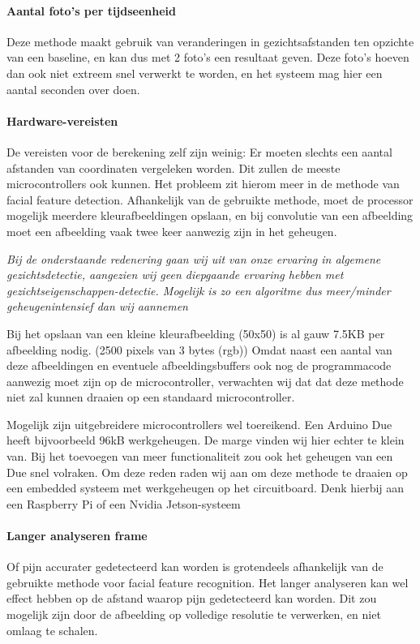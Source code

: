 \documentclass[11pt]{article}
\begin{document}
    \paragraph{Aantal foto's per tijdseenheid}
    Deze methode maakt gebruik van veranderingen in gezichtsafstanden ten opzichte van een baseline, en kan dus met 2 foto's een resultaat geven.
    Deze foto's hoeven dan ook niet extreem snel verwerkt te worden, en het systeem mag hier een aantal seconden over doen.

    \paragraph{Hardware-vereisten}\label{meth1-hardware}
    De vereisten voor de berekening zelf zijn weinig: Er moeten slechts een aantal afstanden van coordinaten vergeleken worden.
    Dit zullen de meeste microcontrollers ook kunnen.
    Het probleem zit hierom meer in de methode van facial feature detection.
    Afhankelijk van de gebruikte methode, moet de processor mogelijk meerdere kleurafbeeldingen opslaan, en bij convolutie van een afbeelding moet een afbeelding vaak twee keer aanwezig zijn in het geheugen.

    \emph{Bij de onderstaande redenering gaan wij uit van onze ervaring in algemene gezichtsdetectie, aangezien wij geen diepgaande ervaring hebben met gezichtseigenschappen-detectie.
    Mogelijk is zo een algoritme dus meer/minder geheugenintensief dan wij aannemen}

    Bij het opslaan van een kleine kleurafbeelding (50x50) is al gauw 7.5KB per afbeelding nodig. (2500 pixels van 3 bytes (rgb))
    Omdat naast een aantal van deze afbeeldingen en eventuele afbeeldingsbuffers ook nog de programmacode aanwezig moet zijn op de microcontroller,
    verwachten wij dat dat deze methode niet zal kunnen draaien op een standaard microcontroller.


    Mogelijk zijn uitgebreidere microcontrollers wel toereikend.
    Een Arduino Due heeft bijvoorbeeld 96kB werkgeheugen.
    De marge vinden wij hier echter te klein van.
    Bij het toevoegen van meer functionaliteit zou ook het geheugen van een Due snel volraken.
    Om deze reden raden wij aan om deze methode te draaien op een embedded systeem met werkgeheugen op het circuitboard.
    Denk hierbij aan een Raspberry Pi of een Nvidia Jetson-systeem

    \paragraph{Langer analyseren frame}
    Of pijn accurater gedetecteerd kan worden is grotendeels afhankelijk van de gebruikte methode voor facial feature recognition.
    Het langer analyseren kan wel effect hebben op de afstand waarop pijn gedetecteerd kan worden.
    Dit zou mogelijk zijn door de afbeelding op volledige resolutie te verwerken, en niet omlaag te schalen.
\end{document}
